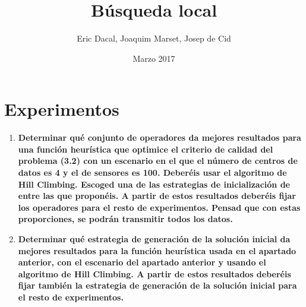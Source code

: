 \documentclass{article}
\title{Búsqueda local}
\author{Eric Dacal, Joaquim Marset, Josep de Cid}
\date{Marzo 2017}
\begin{document}
\maketitle

\section{Experimentos}
\begin{enumerate}
  \item \textbf{Determinar qué conjunto de operadores da mejores resultados para una función heurística que optimice el criterio de calidad del problema (3.2) con un escenario en el que el número de centros de datos es 4 y el de sensores es 100. Deberéis usar el algoritmo de Hill Climbing. Escoged una de las estrategias de inicialización de entre las que proponéis. A partir de estos resultados deberéis fijar los operadores para el resto de experimentos. Pensad que con estas proporciones, se podrán transmitir todos los datos.}

  \item \textbf{Determinar qué estrategia de generación de la solución inicial da mejores resultados para la función heurística usada en el apartado anterior, con el escenario del apartado anterior y usando el algoritmo de Hill Climbing. A partir de estos resultados deberéis fijar también la estrategia de generación de la solución inicial para el resto de experimentos.}


\end{enumerate}
\end{document}
